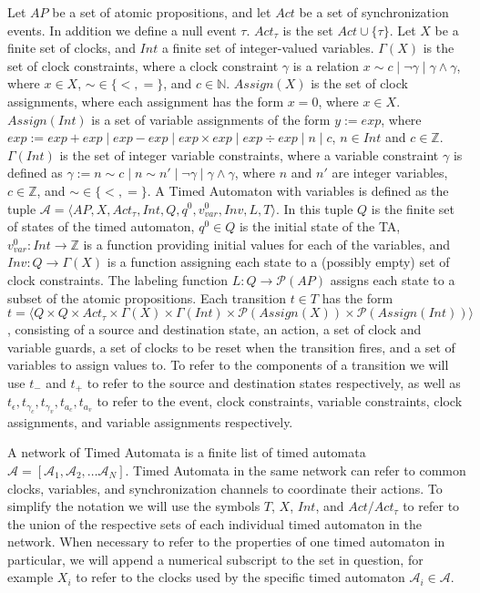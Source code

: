 \documentclass[a4paper,12pt]{article}
\newcommand*\BitOr{\mathbin{|}}
\begin{document}
Let \(AP\) be a set of atomic propositions, and let \(Act\) be a set of
synchronization events. In addition we define a null event \(\tau\).
\(Act_{\tau}\) is the set \(Act \cup \{\tau\}\). Let \(X\) be a finite set of
clocks, and \(Int\) a finite set of integer-valued variables. \(\Gamma(X)\) is
the set of clock constraints, where a clock constraint \(\gamma\) is a relation
\(x \sim c \BitOr \neg \gamma\BitOr \gamma \land \gamma\), where \(x \in X\),
\(\sim \in \{<,=\}\), and \(c \in \mathbb{N}\). \(Assign(X)\) is the set of
clock assignments, where each assignment has the form \(x {=} 0\), where
\(x \in X\iffalse{,\ c {\in} \mathbb{Z}^+}\fi\). \(Assign(Int)\) is a set of
variable assignments of the form \(y := exp\), where
\(exp := exp + exp\BitOr exp - exp\BitOr exp \times exp\BitOr exp \div exp\BitOr n\BitOr c\),
\(n \in Int\) and \(c \in \mathbb{Z}\). \(\Gamma(Int)\) is the set of integer
variable constraints, where a variable constraint \(\gamma\) is defined as
\(\gamma := n \sim c\BitOr n \sim n'\BitOr \neg \gamma\BitOr \gamma \land \gamma\),
where \(n\) and \(n'\) are integer variables, \(c \in \mathbb{Z}\), and
\(\sim \in \{<,=\}\). A Timed Automaton with variables is defined as the tuple
\(\mathcal{A} = \big \langle AP,X, Act_{\tau}, Int, Q, q^0, v_{var}^0, Inv, L, T \big \rangle\).
In this tuple \(Q\) is the finite set of states of the timed automaton,
\(q^0 \in Q\) is the initial state of the TA,
\(v_{var}^{0} : Int \rightarrow \mathbb{Z}\) is a function providing initial
values for each of the variables, and \(Inv : Q \rightarrow \Gamma(X)\) is a
function assigning each state to a (possibly empty) set of clock constraints.
The labeling function \(L: Q \rightarrow \mathcal{P}(AP)\) assigns each state to
a subset of the atomic propositions. Each transition \(t \in T\) has the form
\(t = \big \langle Q \times Q \times Act_{\tau} \times \Gamma(X) \times \Gamma(Int) \times \mathcal{P}(Assign(X)) \times \mathcal{P}(Assign(Int)) \big \rangle \),
consisting of a source and destination state, an action, a set of clock and
variable guards, a set of clocks to be reset when the transition fires, and a
set of variables to assign values to. To refer to the components of a transition
we will use \(t_-\) and \(t_+\) to refer to the source and destination states
respectively, as well as
\(t_\epsilon, t_{\gamma_c}, t_{\gamma_v}, t_{a_c}, t_{a_v}\) to refer to the
event, clock constraints, variable constraints, clock assignments, and variable
assignments respectively.

A network of Timed Automata is a finite list of timed automata \(\mathcal{A} =
[\mathcal{A}_1, \mathcal{A}_2, \ldots \mathcal{A}_N]\). Timed Automata in the
same network can refer to common clocks, variables, and synchronization channels
to coordinate their actions. To simplify the notation we will use the symbols
\(T\), \(X\), \(Int\), and \(Act/Act_{\tau}\) to refer to the union of the respective
sets of each individual timed automaton in the network. When necessary to refer
to the properties of one timed automaton in particular, we will append a
numerical subscript to the set in question, for example \(X_i\) to refer to the
clocks used by the specific timed automaton \(\mathcal{A}_{i} \in \mathcal{A}\).
\end{document}
